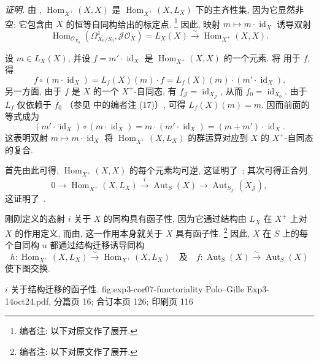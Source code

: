 \noindent\textit{证明.}
由 ,
\(\operatorname{Hom}_{X^+}(X,X)\) 是
\(\operatorname{Hom}_{X^+}(X,L_X)\) 下的主齐性集,
因为它显然非空: 它包含由 \(X\) 的恒等自同构给出的标定点.
\footnote{编者注: 以下对原文作了展开.}
因此, 映射 \(m\mapsto m\cdot\operatorname{id}_X\) 诱导双射
\[
 \operatorname{Hom}_{\mathscr O_{X_0}}
   (\Omega^1_{X_0/S_0},\mathscr J\mathscr O_X)
 =L_X(X)
 \xrightarrow{\sim}
 \operatorname{Hom}_{X^+}(X,X).
\]

设 \(m\in L_X(X)\), 并设
\(f=m'\cdot\operatorname{id}_X\) 是
\(\operatorname{Hom}_{X^+}(X,X)\) 的一个元素.
将  用于 \(f\), 得
\[
 f\circ(m\cdot\operatorname{id}_X)
 =L_f(X)(m)\cdot f
 =L_f(X)(m)\cdot(m'\cdot\operatorname{id}_X).
\]
另一方面, 由于 \(f\) 是 \(X\) 的一个 \(X^+\)-自同态,
有 \(f_{\mathscr J}=\operatorname{id}_{X_{\mathscr J}}\),
从而 \(f_0=\operatorname{id}_{X_0}\).
由于 \(L_f\) 仅依赖于 \(f_0\)
（参见  中的编者注 (17)）,
可得 \(L_f(X)(m)=m\). 因而前面的等式成为
\[
 (m'\cdot\operatorname{id}_X)\circ
 (m\cdot\operatorname{id}_X)
 =m\cdot(m'\cdot\operatorname{id}_X)
 =(m+m')\cdot\operatorname{id}_X.
\]
这表明双射 \(m\mapsto m\cdot\operatorname{id}_X\)
将 \(\operatorname{Hom}_{X^+}(X,L_X)\) 的群运算对应到
\(X\) 的 \(X^+\)-自同态的复合.

首先由此可得, \(\operatorname{Hom}_{X^+}(X,X)\) 的每个元素均可逆,
这证明了~;
其次可得正合列
\[
 0\longrightarrow \operatorname{Hom}_{X^+}(X,L_X)
 \xrightarrow{\ i\ }\operatorname{Aut}_S(X)
 \longrightarrow\operatorname{Aut}_{S_{\mathscr J}}(X_{\mathscr J}),
\]
这证明了~.

刚刚定义的态射 \(i\) 关于 \(X\) 的同构具有函子性,
因为它通过结构由 \(L_X\) 在 \(X^+\) 上对 \(X\) 的作用定义,
而由,
这一作用本身就关于 \(X\) 具有函子性.
\footnote{编者注: 以下对原文作了展开.}
因此, \(X\) 在 \(S\) 上的每个自同构 \(u\) 都通过结构迁移诱导同构
\[
 h:\operatorname{Hom}_{X^+}(X,L_X)
   \xrightarrow{\sim}\operatorname{Hom}_{X^+}(X,L_X)
 \quad\text{及}\quad
 f:\operatorname{Aut}_S(X)
   \xrightarrow{\sim}\operatorname{Aut}_S(X)
\]
使下图交换.

  {\(i\) 关于结构迁移的函子性.}
  {fig:exp3-cor07-functoriality}
  {Polo--Gille Exp3-14oct24.pdf, 分篇页 16; 合订本页 126; 印刷页 116}

